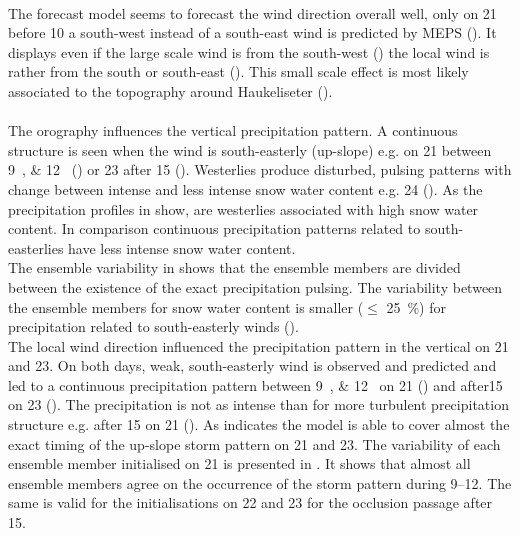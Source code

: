 \\
The forecast model seems to forecast the wind direction overall well, only on \SI{21}{\dec} before \SI{10}{\UTC} a south-west instead of a south-east wind is predicted by MEPS (). It displays even if the large scale wind is from the south-west () the local wind is rather from the south or south-east (). This small scale effect is most likely associated to the topography around Haukeliseter ().
\\
\\
The orography influences the vertical precipitation pattern. A continuous structure is seen when the wind is south-easterly (up-slope) e.g. on \num{21} between \SIlist{9;12}{\UTC} () or \SI{23}{\dec} after \SI{15}{\UTC} (). Westerlies produce disturbed, pulsing patterns with change between intense and less intense snow water content e.g. \SI{24}{\dec} (). As the precipitation profiles in  show, are westerlies associated with high snow water content. In comparison continuous precipitation patterns related to south-easterlies have less intense snow water content.
\\
The ensemble variability in  shows that the ensemble members are divided between the existence of the exact precipitation pulsing. 
The variability between the ensemble members for snow water content is smaller ($\le$ \SI{25}{\percent}) for precipitation related to south-easterly winds (). 
\\
The local wind direction influenced the precipitation pattern in the vertical on \num{21} and \SI{23}{\dec}. On both days, weak, south-easterly wind is observed and predicted and led to a continuous precipitation pattern between \SIlist{9;12}{\UTC} on \num{21} () and after\SI{15}{\UTC} on \SI{23}{\dec} (). The precipitation is not as intense than for more turbulent precipitation structure e.g. after \SI{15}{\UTC} on \SI{21}{\dec} ().
As  indicates the model is able to cover almost the exact timing of the up-slope storm pattern on \num{21} and \SI{23}{\dec}. The variability of each ensemble member initialised on \SI{21}{\dec} is presented in . It shows that almost all ensemble members agree on the occurrence of the storm pattern during \SIrange{9}{12}{\UTC}. The same is valid for the initialisations on \num{22} and \SI{23}{\dec} for the occlusion passage after \SI{15}{\UTC}.

